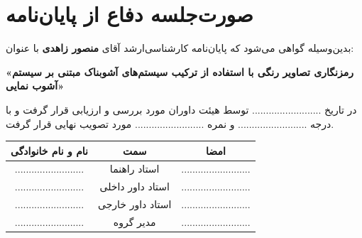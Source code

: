 \chapter*{صورت‌جلسه دفاع از پایان‌نامه}

بدین‌وسیله گواهی می‌شود که پایان‌نامه کارشناسی‌ارشد آقای \textbf{منصور زاهدی} با عنوان:
\begin{center}
\textbf{«رمزنگاری تصاویر رنگی با استفاده از ترکیب سیستم‌های آشوبناک مبتنی بر سیستم آشوب نمایی»}
\end{center}
در تاریخ ......................... توسط هیئت داوران مورد بررسی و ارزیابی قرار گرفت و با درجه ......................... و نمره ......................... مورد تصویب نهایی قرار گرفت.

\vspace{2cm}

\begin{center}
\begin{tabular}{ccc}
\textbf{نام و نام خانوادگی} & \textbf{سمت} & \textbf{امضا} \\ \hline
......................... & استاد راهنما & ......................... \\
......................... & استاد داور داخلی & ......................... \\
......................... & استاد داور خارجی & ......................... \\
......................... & مدیر گروه & ......................... \\
\end{tabular}
\end{center}

\newpage
